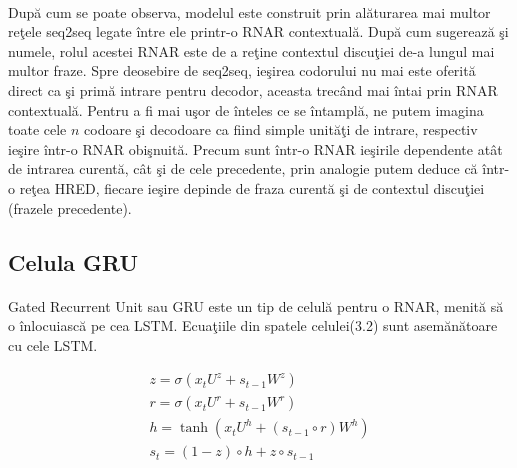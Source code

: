 \paragraph{}
Dup\u a cum se poate observa, modelul este construit prin al\u aturarea mai multor re\c tele seq2seq legate \^ intre ele printr-o RNAR contextual\u a. Dup\u a cum sugereaz\u a \c si numele, rolul acestei RNAR este de a re\c tine contextul discu\c tiei de-a lungul mai multor fraze. Spre deosebire de seq2seq, ie\c sirea codorului nu mai este oferit\u a direct ca \c si prim\u a intrare pentru decodor, aceasta trec\^ and mai \^ intai prin RNAR contextual\u a. Pentru a fi mai u\c sor de \^ inteles ce se \^ intampl\u a, ne putem imagina toate cele \(n\) codoare \c si decodoare ca fiind simple unit\u a\c ti de intrare, respectiv ie\c sire \^ intr-o RNAR obi\c snuit\u a. Precum sunt \^ intr-o RNAR ie\c sirile dependente at\^ at de intrarea curent\u a, c\^ at \c si de cele precedente, prin analogie putem deduce c\u a \^ intr-o re\c tea HRED, fiecare ie\c sire depinde de fraza curent\u a \c si de contextul discu\c tiei (frazele precedente).

\subsection{Celula GRU}

\paragraph{}
Gated Recurrent Unit sau GRU este un tip de celul\u a pentru o RNAR, menit\u a s\u a o \^ inlocuiasc\u a pe cea LSTM. Ecua\c tiile din spatele celulei(3.2) sunt asem\u an\u atoare cu cele LSTM.

\begin{equation}
\begin{split}
z = \sigma(x_{t}U^{z} + s_{t-1}W^{z})\\
r = \sigma(x_{t}U^{r} + s_{t-1}W^{r})\\
h = \tanh(x_{t}U^{h} + (s_{t-1} \circ r)W^{h})\\
s_{t} = (1 - z) \circ h + z \circ s_{t-1}\\
\end{split}
\end{equation}

